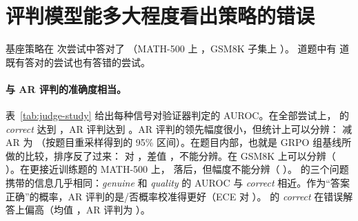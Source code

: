 
\section{评判模型能多大程度看出策略的错误}\label{sec:res-study}

基座策略在  次尝试中答对了 （MATH-500 上 ，GSM8K 子集上 ）。 道题中有  道既有答对的尝试也有答错的尝试。

\paragraph{\kev{} 与 AR 评判的准确度相当。} 表~\ref{tab:judge-study} 给出每种信号对验证器判定的 AUROC。在全部尝试上，\kev{} 的 \emph{correct} 达到 ，AR 评判达到 。AR 评判的领先幅度很小，但统计上可以分辨：\kev{} 减 AR 为  （按题目重采样得到的 95\% 区间）。在题目内部，也就是 GRPO 组基线所做的比较，排序反了过来： 对 ，差值  ，不能分辨。在 GSM8K 上可以分辨（ ）。在更接近训练题的 MATH-500 上，\kev{} 落后，但幅度不能分辨（ ）。\kev{} 的三个问题携带的信息几乎相同：\emph{genuine} 和 \emph{quality} 的 AUROC 与 \emph{correct} 相近。作为“答案正确”的概率，AR 评判的是/否概率校准得更好（ECE  对 ）。\kev{} 的 \emph{correct} 在错误解答上偏高（均值 ，AR 评判为 ）。

\begin{table}[t]
\centering\small

\caption{在 1000 道题（MATH-500 和 GSM8K 测试集中的 500 道）上、每题 4 次基座策略尝试中，各评判信号对验证器判定的 AUROC：全部尝试上的，以及题目内部的（同一道题中判定不同的尝试对）；该信号作为“正确”概率的 ECE 和 Brier 分数（主要对 \emph{correct} 类问题有意义）。}
\label{tab:judge-study}
\end{table}

